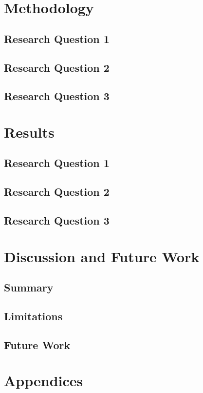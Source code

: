 \documentclass[12pt,bibliography=totocnumbered]{scrartcl}
\begin{document}
\section{Methodology}
\subsection{Research Question 1}
\subsection{Research Question 2}
\subsection{Research Question 3}

\section{Results}
\subsection{Research Question 1}
\subsection{Research Question 2}
\subsection{Research Question 3}

\section{Discussion and Future Work}
\subsection{Summary}
\subsection{Limitations}
\subsection{Future Work}
\printbibliography

\section{Appendices}
\end{document}
